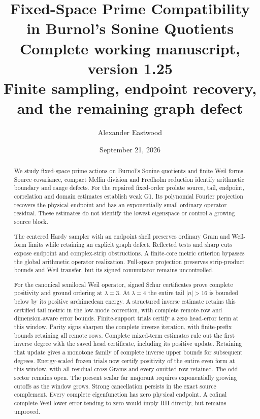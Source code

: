 \documentclass[11pt]{article}
\title{\textbf{Fixed-Space Prime Compatibility in Burnol's Sonine Quotients}\\[5pt]
\large Complete working manuscript, version 1.25\\
\normalsize Finite sampling, endpoint recovery, and the remaining graph defect}
\author{Alexander Eastwood}
\date{September 21, 2026}
\theoremstyle{remark}
\begin{document}
\maketitle
\begin{abstract}
We study fixed-space prime actions on Burnol's Sonine quotients and
finite Weil forms. Source covariance, compact Mellin division and
Fredholm reduction identify arithmetic boundary and range defects.
For the repaired fixed-order prolate source, tail, endpoint, correlation
and domain estimates establish weak G1. Its polynomial Fourier
projection recovers the physical endpoint and has an exponentially
small ordinary operator residual. These estimates do not identify
the lowest eigenspace or control a growing source block.

The centered Hardy sampler with an endpoint shell preserves ordinary
Gram and Weil-form limits while retaining an explicit graph defect.
Reflected tests and sharp cuts expose endpoint and complex-strip
obstructions. A finite-core metric criterion bypasses the global
arithmetic operator realization. Full-space projection preserves
strip-product bounds and Weil transfer, but its signed commutator
remains uncontrolled.

For the canonical semilocal Weil operator, signed Schur certificates
prove complete positivity and ground ordering at $\lambda=3$.
At $\lambda=4$ the entire tail $|n|>16$ is bounded below by its
positive archimedean energy. A structured inverse estimate retains
this certified tail metric in the low-mode correction, with complete
remote-row and dimension-aware error bounds. Finite-support trials
certify a zero head-error term at this window. Parity signs sharpen the complete inverse
iteration, with finite-prefix bounds retaining all remote rows.
Complete mixed-term estimates rule out the first inverse degree
with the saved head certificate, including its positive update.
Retaining that update gives a monotone family of complete inverse
upper bounds for subsequent degrees. Energy-scaled frozen trials now certify positivity of the entire even
form at this window, with all residual cross-Grams and every omitted
row retained. The odd sector remains open. The present scalar far
majorant requires exponentially growing cutoffs as the window grows.
Strong cancellation persists in the exact
source complement. Every complete eigenfunction has zero physical
endpoint. A cofinal complete-Weil lower error tending to zero would
imply RH directly, but remains unproved.
\end{abstract}
\end{document}
